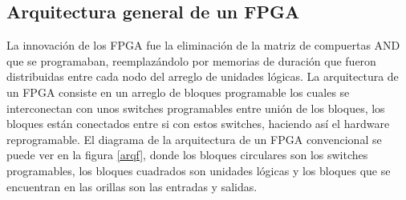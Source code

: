 \documentclass[twoside,spanish,ESP,MSc]{plantillaLabUPV}
\theoremstyle{definition}
\newcommand{\f}{FPGA }
\newcommand{\fs}{FPGAs }
\begin{document}
%
%
%


\subsection{Arquitectura general de un FPGA}
La innovación de los FPGA fue la eliminación de la matriz de compuertas AND que se programaban, reemplazándolo por memorias de duración que fueron distribuidas entre cada nodo del arreglo de unidades lógicas. La arquitectura de un \f consiste en un arreglo de bloques programable los cuales se interconectan con unos switches programables entre unión de los bloques, los bloques están conectados entre si con estos switches, haciendo así el hardware reprogramable. El diagrama de la arquitectura de un \f convencional se puede ver en la figura \ref{arqf}, donde los bloques circulares son los switches programables, los bloques cuadrados son unidades lógicas y los bloques que se encuentran en las orillas son las entradas y salidas. 
\end{document}
